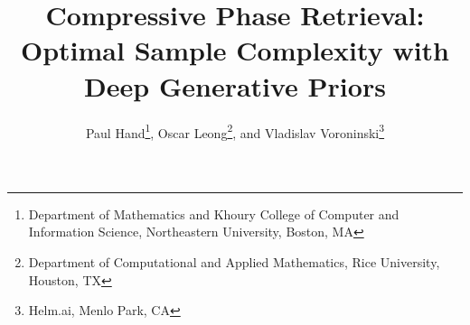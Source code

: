 \documentclass[11pt]{article}
\title{Compressive Phase Retrieval: Optimal Sample Complexity with Deep Generative Priors}
\author{Paul Hand\thanks{Department of Mathematics and Khoury College of Computer and Information Science, Northeastern University, Boston, MA}, Oscar Leong\thanks{Department of Computational and Applied Mathematics, Rice University, Houston, TX}, and Vladislav Voroninski\thanks{Helm.ai, Menlo Park, CA}}
\newcommand{\R}{\mathbb{R}}
\newcommand{\G}{G}
\theoremstyle{remark}
\begin{document}
\maketitle



\begin{abstract}
 

\end{abstract}
\end{document}
